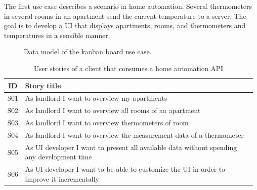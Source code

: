 The first use case describes a scenario in home automation. Several thermometers in several rooms in an apartment send the current temperature to a server. The goal is to develop a UI that displays apartments, rooms, and thermometers and temperatures in a sensible manner.

\begin{figure}[!htb]
  \caption{\label{fig:my-label} Data model of the kanban board use case.}
\end{figure}

\begin{table}
  \begin{center}
    \begin{tabular}{ |c|l| }
      \hline
      ID & Story title \\
      \hline
      S01 & As landlord I want to overview my apartments \\
      S02 & As landlord I want to overview all rooms of an apartment \\
      S03 & As landlord I want to overview thermometers of room \\
      S04 & As landlord I want to overview the measurement data of a thermometer \\
      S05 & As UI developer I want to present all available data without spending any development time \\
      S06 & As UI developer I want to be able to customize the UI in order to improve it incrementally \\
      \hline
    \end{tabular}
    \caption{User stories of a client that consumes a home automation API}
  \end{center}
\end{table}

